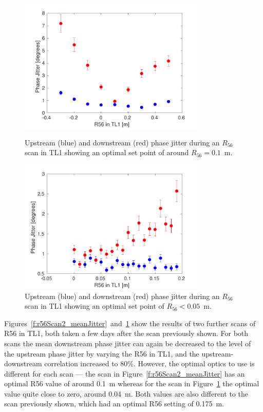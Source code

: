 \begin{figure}
  \centering
  \includegraphics[width=0.8\textwidth]{Figures/propagation/r56Scan2_meanJitter}
  \caption{Upstream (blue) and downstream (red) phase jitter during an \(R_{56}\) scan in TL1 showing an optimal set point of around \(R_{56}=0.1\)~m.}
  \label{f:r56Scan2_meanJitter}
  \includegraphics[width=0.8\textwidth]{Figures/propagation/r56Scan3_meanJitter}
  \caption{Upstream (blue) and downstream (red) phase jitter during an \(R_{56}\) scan in TL1 showing an optimal set point of \(R_{56}<0.05\)~m.}
  \label{f:r56Scan3_meanJitter}
\end{figure}


Figures~\ref{f:r56Scan2_meanJitter}~and~\ref{f:r56Scan3_meanJitter} show the results of two further scans of R56 in TL1, both taken a few days after the scan previously shown. For both scans the mean downstream phase jitter can again be decreased to the level of the upstream phase jitter by varying the R56 in TL1, and the upstream-downstream correlation increased to 80\%. However, the optimal optics to use is different for each scan --- the scan in Figure~\ref{f:r56Scan2_meanJitter} has an optimal R56 value of around 0.1~m whereas for the scan in Figure~\ref{f:r56Scan3_meanJitter} the optimal value quite close to zero, around 0.04~m. Both values are also different to the scan previously shown, which had an optimal R56 setting of 0.175~m.

